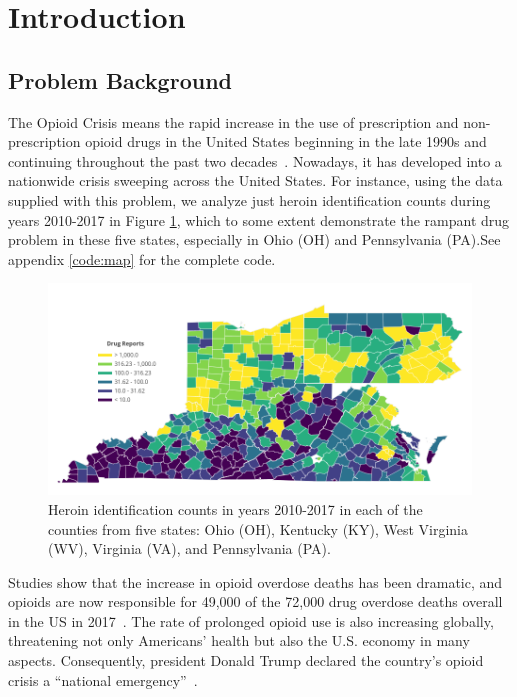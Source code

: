 \documentclass{mcmthesis}
\begin{document}
\maketitle

\tableofcontents

\newpage

\section{Introduction}	
\subsection{Problem Background}
The Opioid Crisis means the rapid increase in the use of prescription and non-prescription opioid drugs in the United States beginning in the late 1990s and continuing throughout the past two decades~\cite{op}. Nowadays, it has developed into a nationwide crisis sweeping across the United States. For instance, using the data supplied with this problem, we analyze just heroin identification counts during years 2010-2017 in Figure \ref{situation}, which to some extent demonstrate the rampant drug problem in these five states, especially in Ohio (OH) and Pennsylvania (PA).See appendix \ref{code:map} for the complete code. 

\begin{figure}[htbp]
	\centering 
	\includegraphics[width=1\linewidth]{../figure/test.png}  
	\caption{Heroin identification counts in years 2010-2017 in each of the counties from five states: Ohio (OH), Kentucky (KY), West Virginia (WV), Virginia (VA), and Pennsylvania (PA).} 
	\label{situation}  
\end{figure}

Studies show that the increase in opioid overdose deaths has been dramatic, and opioids are now responsible for 49,000 of the 72,000 drug overdose deaths overall in the US in 2017~\cite{NIH}. The rate of prolonged opioid use is also increasing globally, threatening not only Americans' health but also the U.S. economy in many aspects. Consequently, president Donald Trump declared the country's opioid crisis a ``national emergency''~\cite{Trump}.
\end{document}
